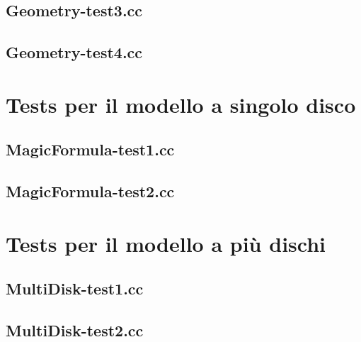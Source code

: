 \subsection{Geometry-test3.cc}
\renewcommand{\baselinestretch}{1.0}

\renewcommand{\baselinestretch}{1.25}
%
\subsection{Geometry-test4.cc}
\renewcommand{\baselinestretch}{1.0}

\renewcommand{\baselinestretch}{1.25}
%
\section{Tests per il modello a singolo disco}
%
\subsection{MagicFormula-test1.cc}
\renewcommand{\baselinestretch}{1.0}

\renewcommand{\baselinestretch}{1.25}
%
\subsection{MagicFormula-test2.cc}
\renewcommand{\baselinestretch}{1.0}

\renewcommand{\baselinestretch}{1.25}
%
\section{Tests per il modello a più dischi}
%
\subsection{MultiDisk-test1.cc}
\renewcommand{\baselinestretch}{1.0}

\renewcommand{\baselinestretch}{1.25}
%
\subsection{MultiDisk-test2.cc}
\renewcommand{\baselinestretch}{1.0}

\renewcommand{\baselinestretch}{1.25}